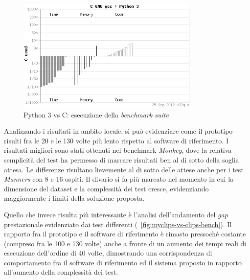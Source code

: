 \begin{figure}
\centering
\includegraphics[width=0.8\textwidth]{Immagini/Capitolo3/c-vs-python.png}
\caption{Python 3 vs C: esecuzione della \emph{benchmark suite}~\cite{cpybench}  }\label{fig:c-vs-python-bench}
\end{figure}

Analizzando i risultati in ambito locale, si può evidenziare come il prototipo risulti fra le 20 e le 130 volte più lento rispetto al software di riferimento. I risultati migliori sono stati ottenuti nel benchmark \emph{Monkey}, dove la relativa semplicità del test ha permesso di marcare risultati ben al di sotto della soglia attesa. Le differenze risultano lievemente al di sotto delle attese anche per i test \emph{Manners} con 8 e 16 ospiti. Il divario si fa più marcato nel momento in cui la dimensione del dataset e la complessità dei test cresce, evidenziando maggiormente i limiti della soluzione proposta.

Quello che invece risulta più interessante è l'analisi dell'andamento del \emph{gap} prestazionale evidenziato dai test differenti (\figurename~\ref{fig:myclips-vs-clips-bench}). Il rapporto fra il prototipo e il software di riferimento è rimasto pressoché costante (compreso fra le 100 e 130 volte) anche a fronte di un aumento dei tempi reali di esecuzione dell'ordine di 40 volte, dimostrando una corrispondenza di comportamento fra il software di riferimento ed il sistema proposto in rapporto all'aumento della complessità dei test.


